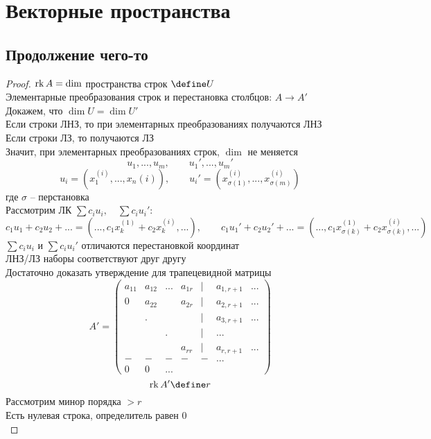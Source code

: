 \chapter{Векторные пространства}

\section{Продолжение чего-то}

\begin{proof}
    $ \operatorname{rk} A = \dim $ пространства строк $ \define U $ \\
    Элементарные преобразования строк и перестановка столбцов: $ A \to A' $ \\
    Докажем, что $ \dim U = \dim U' $ \\
    Если строки ЛНЗ, то при элементарных преобразованиях получаются ЛНЗ \\
    Если строки ЛЗ, то получаются ЛЗ \\
    Значит, при элементарных преобразованиях строк, $ \dim $ не меняется
    $$ u_1, ..., u_m, \qquad u_1', ..., u_m' $$
    $$ u_i = (x_1^{(i)}, ..., x_n{(i)}), \qquad u_i' = (x_{\sigma(1)}^{(i)}, ..., x_{\sigma(m)}^{(i)}) $$
    где $ \sigma $ -- перстановка \\
    Рассмотрим ЛК $ \sum c_iu_i, \quad \sum c_iu_i' $:
    $$ c_1u_1 + c_2u_2 + ... = (..., c_1x_k^{(1)} + c_2x_k^{(i)}, ...), \qquad c_1u_1' + c_2u_2' + ... = (..., c_1x_{\sigma(k)}^{(1)} + c_2x_{\sigma(k)}^{(i)}, ...) $$
    $ \sum c_iu_i $ и $ \sum c_iu_i' $ отличаются перестановкой координат \\
    ЛНЗ/ЛЗ наборы соответствуют друг другу \\
    Достаточно доказать утверждение для трапецевидной матрицы
    $$  A' =
    \begin{pmatrix}
        a_{11} & a_{12} & ... & a_{1r} & | & a_{1, r + 1} & ... \\
        0 & a_{22} &  & a_{2r} & | & a_{2, r + 1} & ... \\
         & . &  &  & | & a_{3, r + 1} & ... \\
         &  & . &  & | & ... \\
         &  &  & a_{rr} & | & a_{r, r + 1} & ... \\
        - & - & - & - & - & ... \\
        0 & 0 & ...
    \end{pmatrix} $$
    $$ \rk A' \define r $$
    Рассмотрим минор порядка $ > r $ \\
    Есть нулевая строка, определитель равен 0 \\

\end{proof}
